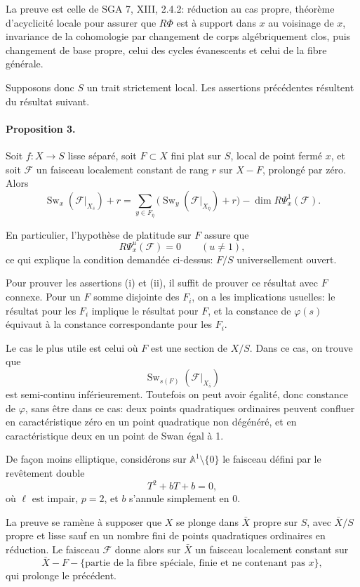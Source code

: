 \documentclass[11pt]{article}
\newcommand{\F}{\mathcal F}
\DeclareMathOperator{\Sw}{Sw}
\begin{document}
La preuve est celle de SGA 7, XIII, 2.4.2: réduction au cas propre, théorème d'acyclicité locale pour assurer que \(R\Phi\) est à support dans \(x\) au voisinage de \(x\), invariance de la cohomologie par changement de corps algébriquement clos, puis changement de base propre, celui des cycles évanescents et celui de la fibre générale.

Supposons donc \(S\) un trait strictement local. Les assertions précédentes résultent du résultat suivant.

\paragraph{Proposition 3.}
Soit \(f:X\to S\) lisse séparé, soit \(F\subset X\) fini plat sur \(S\), local de point fermé \(x\), et soit \(\F\) un faisceau localement constant de rang \(r\) sur \(X-F\), prolongé par zéro. Alors
\[
\Sw_x(\F|_{X_{\bar s}})+r
=
\sum_{y\in F_{\bar\eta}}
\bigl(\Sw_y(\F|_{X_{\bar\eta}})+r\bigr)
-
\dim R\Psi_x^1(\F).
\]

En particulier, l'hypothèse de platitude sur \(F\) assure que
\[
  R\Psi_x^u(\F)=0\qquad (u\ne 1),
\]
ce qui explique la condition demandée ci-dessus: \(F/S\) universellement ouvert.

Pour prouver les assertions (i) et (ii), il suffit de prouver ce résultat avec \(F\) connexe. Pour un \(F\) somme disjointe des \(F_i\), on a les implications usuelles: le résultat pour les \(F_i\) implique le résultat pour \(F\), et la constance de \(\varphi(s)\) équivaut à la constance correspondante pour les \(F_i\).

Le cas le plus utile est celui où \(F\) est une section de \(X/S\). Dans ce cas, on trouve que
\[
  \Sw_{s(F)}(\F|_{X_{\bar s}})
\]
est semi-continu inférieurement. Toutefois on peut avoir égalité, donc constance de \(\varphi\), sans être dans ce cas: deux points quadratiques ordinaires peuvent confluer en caractéristique zéro en un point quadratique non dégénéré, et en caractéristique deux en un point de Swan égal à 1.

De façon moins elliptique, considérons sur \(\mathbb A^1\setminus\{0\}\) le faisceau défini par le revêtement double
\[
  T^2+bT+b=0,
\]
où \(\ell\) est impair, \(p=2\), et \(b\) s'annule simplement en \(0\).

La preuve se ramène à supposer que \(X\) se plonge dans \(\bar X\) propre sur \(S\), avec \(\bar X/S\) propre et lisse sauf en un nombre fini de points quadratiques ordinaires en réduction. Le faisceau \(\F\) donne alors sur \(\bar X\) un faisceau localement constant sur
\[
  \bar X-F-\{
  \text{partie de la fibre spéciale, finie et ne contenant pas }x
  \},
\]
qui prolonge le précédent.
\end{document}
